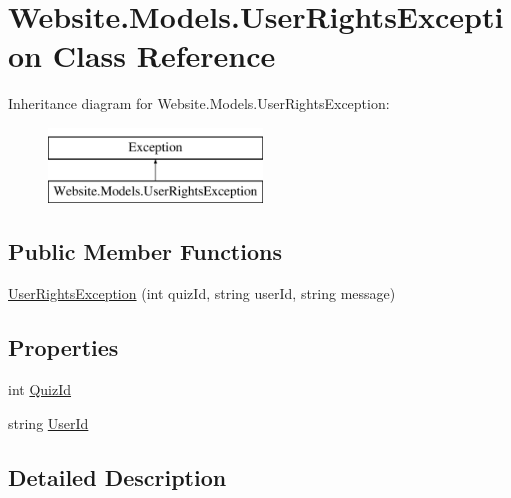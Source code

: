 \hypertarget{class_website_1_1_models_1_1_user_rights_exception}{}\section{Website.\+Models.\+User\+Rights\+Exception Class Reference}
\label{class_website_1_1_models_1_1_user_rights_exception}
Inheritance diagram for Website.\+Models.\+User\+Rights\+Exception\+:\begin{figure}[H]
\begin{center}
\leavevmode
\includegraphics[height=2.000000cm]{class_website_1_1_models_1_1_user_rights_exception}
\end{center}
\end{figure}
\subsection*{Public Member Functions}
\begin{DoxyCompactItemize}
\item 
\hyperlink{class_website_1_1_models_1_1_user_rights_exception_a839cdb5f36f7d2e0a8305e776c047d20}{User\+Rights\+Exception} (int quiz\+Id, string user\+Id, string message)
\end{DoxyCompactItemize}
\subsection*{Properties}
\begin{DoxyCompactItemize}
\item 
int \hyperlink{class_website_1_1_models_1_1_user_rights_exception_a2bf34fe8ab6d1f6c8e4782163eec03d4}{Quiz\+Id}
\item 
string \hyperlink{class_website_1_1_models_1_1_user_rights_exception_a27aee9fbb61129a1f244fa850d0f6aa2}{User\+Id}
\end{DoxyCompactItemize}


\subsection{Detailed Description}


